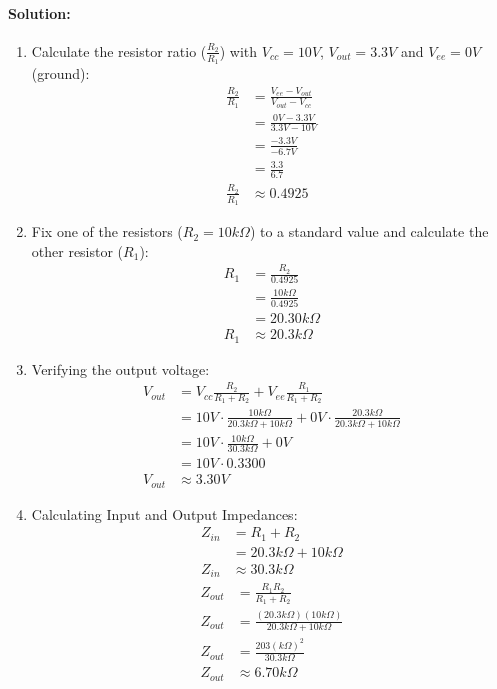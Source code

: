 \paragraph{Solution:}
\begin{enumerate}
  \item Calculate the resistor ratio (\(\frac{R_2}{R_1}\)) with
    \(V_{cc} = 10V\), \(V_{out} = 3.3V\) and \(V_{ee} = 0V\) (ground):
    \begin{align*}
      \frac{R_2}{R_1} &= \frac{V_{ee} - V_{out}}{V_{out} - V_{cc}} \\
      &= \frac{0V - 3.3V}{3.3V - 10V} \\
      &= \frac{-3.3V}{-6.7V} \\
      &= \frac{3.3}{6.7} \\
    \frac{R_2}{R_1} &\approx 0.4925
    \end{align*}
  \item Fix one of the resistors (\(R_2 = 10 k\Omega\)) to a standard
    value and calculate the other resistor (\(R_1\)):
    \begin{align*}
      R_1 &= \frac{R_2}{0.4925} \\
      &= \frac{10 k\Omega}{0.4925} \\
      &= 20.30 k\Omega \\
      R_1 &\approx 20.3 k\Omega
    \end{align*}
  \item Verifying the output voltage:
    \begin{align*}
      V_{out} &= V_{cc}\frac{R_2}{R_1 + R_2} + V_{ee}\frac{R_1}{R_1 + R_2} \\
      &= 10V \cdot \frac{10 k\Omega}{20.3 k\Omega + 10 k\Omega} + 0V \cdot \frac{20.3 k\Omega}{20.3 k\Omega + 10 k\Omega} \\
      &= 10V \cdot \frac{10 k\Omega}{30.3 k\Omega} + 0V \\
      &= 10V \cdot 0.3300 \\
      V_{out} &\approx 3.30V
    \end{align*}
  \item Calculating Input and Output Impedances:
    \[
        \begin{aligned}
        Z_{in} &= R_1 + R_2 \\
        &= 20.3 k\Omega + 10 k\Omega \\
        Z_{in} &\approx 30.3 k\Omega
        \end{aligned}
      \]
      \[
        \begin{aligned}
          Z_{out} &= \frac{R_1 R_2}{R_1 + R_2} \\
          Z_{out} &= \frac{(20.3 k\Omega)(10 k\Omega)}{20.3 k\Omega + 10 k\Omega} \\
          Z_{out} &= \frac{203 (k\Omega)^2}{30.3 k\Omega} \\
          Z_{out} &\approx 6.70 k\Omega
        \end{aligned}
      \]
\end{enumerate}

